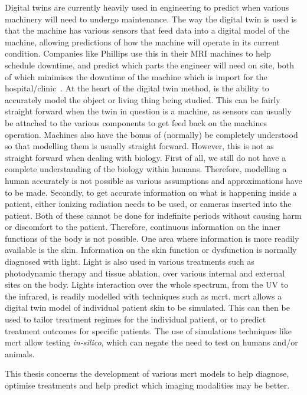\noindent Digital twins are currently heavily used in engineering to predict when various machinery will need to undergo maintenance.
The way the digital twin is used is that the machine has various sensors that feed data into a digital model of the machine, allowing predictions of how the machine will operate in its current condition.
Companies like Phillips use this in their MRI machines to help schedule downtime, and predict which parts the engineer will need on site, both of which minimises the downtime of the machine which is import for the hospital/clinic~\cite{henkvanhouten2018}.
At the heart of the digital twin method, is the ability to accurately model the object or living thing being studied.
This can be fairly straight forward when the twin in question is a machine, as sensors can usually be attached to the various components to get feed back on the machines operation.
Machines also have the bonus of (normally) be completely understood so that modelling them is usually straight forward.
However, this is not as straight forward when dealing with biology.
First of all, we still do not have a complete understanding of the biology within humans.
Therefore, modelling a human accurately is not possible as various assumptions and approximations have to be made.
Secondly, to get accurate information on what is happening inside a patient, either ionizing radiation needs to be used, or cameras inserted into the patient.
Both of these cannot be done for indefinite periods without causing harm or discomfort to the patient.
Therefore, continuous information on the inner functions of the body is not possible.
One area where information is more readily available is the skin.
Information on the skin function or dysfunction is normally diagnosed with light.
Light is also used in various treatments such as photodynamic therapy and tissue ablation, over various internal and external sites on the body.
Lights interaction over the whole spectrum, from the UV to the infrared, is readily modelled with techniques such as \gls*{mcrt}.
\Gls*{mcrt} allows a digital twin model of individual patient skin to be simulated.
This can then be used to tailor treatment regimes for the individual patient, or to predict treatment outcomes for specific patients.
The use of simulations techniques like \gls*{mcrt} allow testing \textit{in-silico}, which can negate the need to test on humans and/or animals.

\medskip
This thesis concerns the development of various \gls*{mcrt} models to help diagnose, optimise treatments and help predict which imaging modalities may be better.

